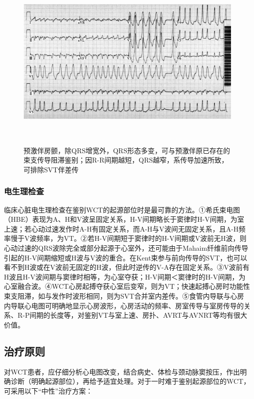 \begin{figure}[!htbp]
 \centering
 \includegraphics[width=6.29167in,height=3.48958in]{./images/Image00456.jpg}
 \captionsetup{justification=centering}
 \caption{预激伴房颤，除QRS增宽外，QRS形态多变，可与预激伴原已存在的束支传导阻滞鉴别；因R-R间期越短，QRS越窄，系传导加速所致，可排除SVT伴差传}
 \label{fig102-17}
  \end{figure} 

\subsubsection{电生理检查}

临床心脏电生理检查在鉴别WCT的起源部位时是最可靠的方法。①希氏束电图（HBE）表现为A、H和V波呈固定关系，H-V间期略长于窦律时H-V间期，为室上速；若心动过速发作时A-H有固定关系，而A-H与V波间无固定关系，且A-H频率慢于V波频率，为VT。②若H-V间期短于窦律时的H-V间期或V波前无H波，则心动过速的QRS波除完全或部分起源于心室外，还可能由于Mahaim纤维前向传导引起的H-V间期缩短或H波与V波的重合。在Kent束参与前向传导的SVT，也可以看不到H波或在V波前无固定的H波，但此时逆传的V-A存在固定关系。③V波前有H波且H-V波间期与窦律时相等，为心室夺获；H-V间期＜窦律时的H-V间期，为心室融合波。④WCT心房起搏夺获心室后变窄，则为VT；快速起搏心房时功能性束支阻滞，如与发作时波形相同，则为SVT合并室内差传。⑤食管内导联与心房内导联心电图可明确地显示心房波形，心房活动的频率、房室传导与室房传导的关系、R-P间期的长度等，对鉴别VT与室上速、房扑、AVRT与AVNRT等均有很大价值。

\subsection{治疗原则}

对WCT患者，应仔细分析心电图改变，结合病史、体检与颈动脉窦按压，作出明确诊断（明确起源部位），再给予适宜处理。对于一时难于鉴别起源部位的WCT，可采用以下“中性”治疗方案：


